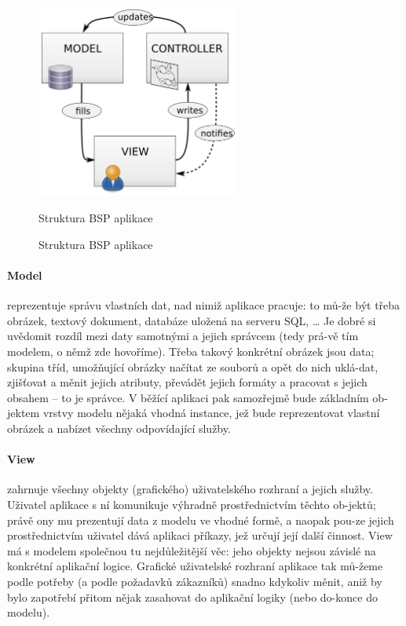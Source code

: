 \documentclass[thesis=M,czech]{FITthesis}[2012/06/26]
\begin{document}
\begin{figure}[H]
	\centering
	\includegraphics[width=0.6\textwidth]{images/mvc.png}
	\caption{Struktura BSP aplikace}
	\label{img:bsp}
	\small
	Struktura BSP aplikace
\end{figure}

\paragraph{Model} reprezentuje správu vlastních dat, nad nimiž aplikace pracuje: to mů-že být třeba obrázek, textový dokument, databáze uložená na serveru SQL, … Je dobré si uvědomit rozdíl mezi daty samotnými a jejich správcem (tedy prá-vě tím modelem, o němž zde hovoříme). Třeba takový konkrétní obrázek jsou data; skupina tříd, umožňující obrázky načítat ze souborů a opět do nich uklá-dat, zjišťovat a měnit jejich atributy, převádět jejich formáty a pracovat s jejich obsahem – to je správce. V běžící aplikaci pak samozřejmě bude základním ob-jektem vrstvy modelu nějaká vhodná instance, jež bude reprezentovat vlastní obrázek a nabízet všechny odpovídající služby.

\paragraph{View} zahrnuje všechny objekty (grafického) uživatelského rozhraní a jejich služby. Uživatel aplikace s ní komunikuje výhradně prostřednictvím těchto ob-jektů; právě ony mu prezentují data z modelu ve vhodné formě, a naopak pou-ze jejich prostřednictvím uživatel dává aplikaci příkazy, jež určují její další činnost.
View má s modelem společnou tu nejdůležitější věc: jeho objekty nejsou závislé na konkrétní aplikační logice. Grafické uživatelské rozhraní aplikace tak mů-žeme podle potřeby (a podle požadavků zákazníků) snadno kdykoliv měnit, aniž by bylo zapotřebí přitom nějak zasahovat do aplikační logiky (nebo do-konce do modelu).
\end{document}
